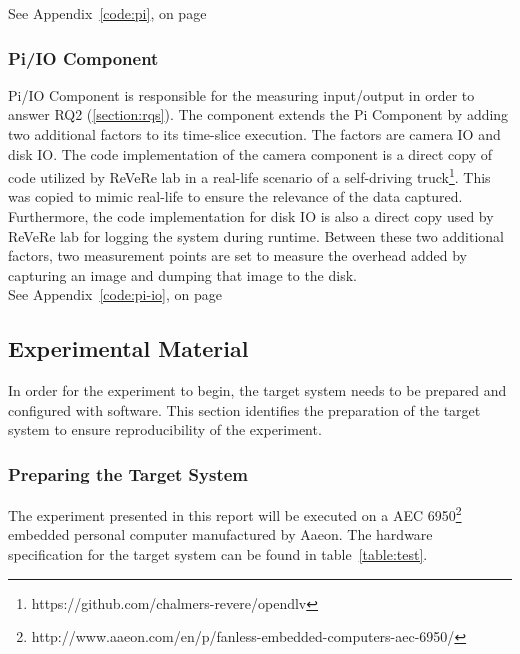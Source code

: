 See Appendix~\ref{code:pi}, on page ~\pageref{code:pi}

\subsubsection{Pi/IO Component}

Pi/IO Component is responsible for the measuring input/output in order to answer RQ2 (\ref{section:rqs}). The component extends the Pi Component by adding two additional factors to its time-slice execution. The factors are camera IO and disk IO. The code implementation of the camera component is a direct copy of code utilized by ReVeRe lab in a real-life scenario of a self-driving truck\footnote{https://github.com/chalmers-revere/opendlv}. This was copied to mimic real-life to ensure the relevance of the data captured. Furthermore, the code implementation for disk IO is also a direct copy used by ReVeRe lab for logging the system during runtime. Between these two additional factors, two measurement points are set to measure the overhead added by capturing an image and dumping that image to the disk.\\

See Appendix~\ref{code:pi-io}, on page ~\pageref{code:pi-io}


\subsection{Experimental Material}
In order for the experiment to begin, the target system needs to be prepared and configured with software. This section identifies the preparation of the target system to ensure reproducibility of the experiment.

\subsubsection{Preparing the Target System}
The experiment presented in this report will be executed on a AEC 6950\footnote{http://www.aaeon.com/en/p/fanless-embedded-computers-aec-6950/} embedded personal computer manufactured by Aaeon.   The hardware specification for the target system can be found in table~\ref{table:test}. 

